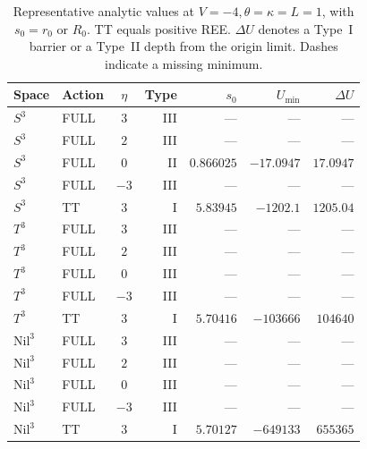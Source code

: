 \begin{table}[htbp]
\centering
\small
\caption{Representative analytic values at $V=-4,\theta=\kappa=L=1$, with $s_0=r_0$ or $R_0$. TT equals positive REE. $\Delta U$ denotes a Type~I barrier or a Type~II depth from the origin limit. Dashes indicate a missing minimum.}\label{tab:v3:4}
\setlength{\tabcolsep}{4pt}
\renewcommand{\arraystretch}{1.25}
\begin{tabular}{llcrrrr}
\toprule
Space & Action & $\eta$ & Type & $s_0$ & $U_{\min}$ & $\Delta U$ \\
\midrule
$S^3$ & FULL & $3$ & III & --- & --- & --- \\
$S^3$ & FULL & $2$ & III & --- & --- & --- \\
$S^3$ & FULL & $0$ & II & $0.866025$ & $-17.0947$ & $17.0947$ \\
$S^3$ & FULL & $-3$ & III & --- & --- & --- \\
$S^3$ & TT & $3$ & I & $5.83945$ & $-1202.1$ & $1205.04$ \\
$T^3$ & FULL & $3$ & III & --- & --- & --- \\
$T^3$ & FULL & $2$ & III & --- & --- & --- \\
$T^3$ & FULL & $0$ & III & --- & --- & --- \\
$T^3$ & FULL & $-3$ & III & --- & --- & --- \\
$T^3$ & TT & $3$ & I & $5.70416$ & $-103666$ & $104640$ \\
$\mathrm{Nil}^3$ & FULL & $3$ & III & --- & --- & --- \\
$\mathrm{Nil}^3$ & FULL & $2$ & III & --- & --- & --- \\
$\mathrm{Nil}^3$ & FULL & $0$ & III & --- & --- & --- \\
$\mathrm{Nil}^3$ & FULL & $-3$ & III & --- & --- & --- \\
$\mathrm{Nil}^3$ & TT & $3$ & I & $5.70127$ & $-649133$ & $655365$ \\
\bottomrule
\end{tabular}
\end{table}
